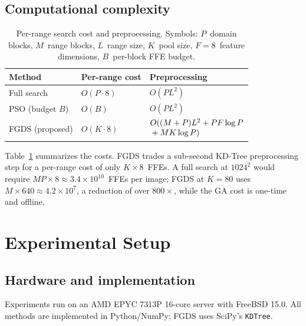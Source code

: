 \documentclass[conference, a4paper]{IEEEtran}
\begin{document}
\subsection{Computational complexity}
\begin{table}[t]
    \centering
    \caption{Per-range search cost and preprocessing. Symbols: \mbox{$P$}~domain blocks, \mbox{$M$}~range blocks, \mbox{$L$}~range size, \mbox{$K$}~pool size, \mbox{$F\!=\!8$}~feature dimensions, \mbox{$B$}~per-block FFE budget.}
    \label{tab:complexity}
    \small
    \setlength{\tabcolsep}{2pt}
    \begin{tabular}{lll}
        \toprule
        \textbf{Method}         & \textbf{Per-range cost} & \textbf{Preprocessing}                                                                        \\
        \midrule
        Full search             & \mbox{$O(P\cdot 8)$}    & \mbox{$O(P L^2)$}                                                                             \\
        PSO (budget \mbox{$B$}) & \mbox{$O(B)$}           & \mbox{$O(P L^2)$}                                                                             \\
        FGDS (proposed)         & \mbox{$O(K\cdot 8)$}    & $\begin{array}{@{}l@{}}O((M+P)L^2 + PF\log P\\{}+ MK\log P)\end{array}$ \\
        \bottomrule
    \end{tabular}
\end{table}
Table~\ref{tab:complexity} summarizes the costs. FGDS trades a sub-second KD-Tree preprocessing step for a per-range cost of only \mbox{$K\!\times\!8$}~FFEs. A full search at \mbox{$1024^2$} would require \mbox{$M\!P\!\times\!8\approx 3.4\times10^{10}$}~FFEs per image; FGDS at \mbox{$K\!=\!80$} uses \mbox{$M\!\times\!640\approx 4.2\times10^7$}, a reduction of over \mbox{$800\times$}, while the GA cost is one-time and offline.


\section{Experimental Setup}
\subsection{Hardware and implementation}
Experiments run on an AMD EPYC 7313P 16-core server with FreeBSD 15.0. All methods are implemented in Python/NumPy; FGDS uses SciPy's \texttt{KDTree}.
\end{document}
